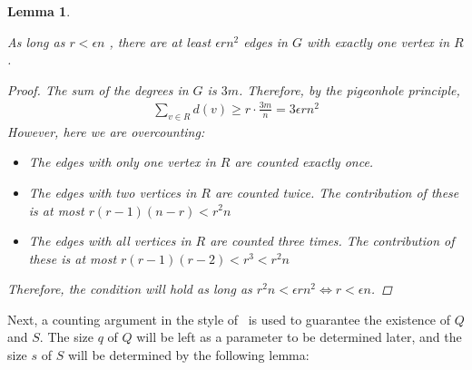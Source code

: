 \documentclass[12pt]{article}
\newtheorem{lemma}[thm]{Lemma}
\begin{document}
    \begin{lemma}\label{many_edges}

        As long as  $r < \epsilon n$ , %
        there are at least $\epsilon r n^2$ edges in $G$ with exactly one vertex in $R$.

        \begin{proof}
            The sum of the degrees in $G$ is $3m$.
            Therefore, by the pigeonhole principle,
            \begin{align*} \label{eq:pigeonhole}
                \sum_{v \in R} d(v) \geq r \cdot \frac{3m}{n} = 3 \epsilon r n^2
            \end{align*}
            However, here we are overcounting:
            \begin{itemize}
                \item The edges with only one vertex in $R$ are counted exactly once.
                \item The edges with two vertices in $R$ are counted twice.
                The contribution of these is at most $r(r-1)(n-r) < r^{2}n$
                \item The edges with all vertices in $R$ are counted three times.
                The contribution of these is at most $r(r-1)(r-2) < r^3 < r^{2}n$
            \end{itemize}

            Therefore, the condition will hold as long as
            $r^{2}n < \epsilon r n^2 \iff r < \epsilon n$.
        \end{proof}
    \end{lemma}

    Next, a counting argument in the style of~\cite{Kovari1954}
    is used to guarantee the existence of $Q$ and $S$.
    The size $q$ of $Q$ will be left as a parameter to be determined later,
    and the size $s$ of $S$ will be determined by the following lemma:
\end{document}
